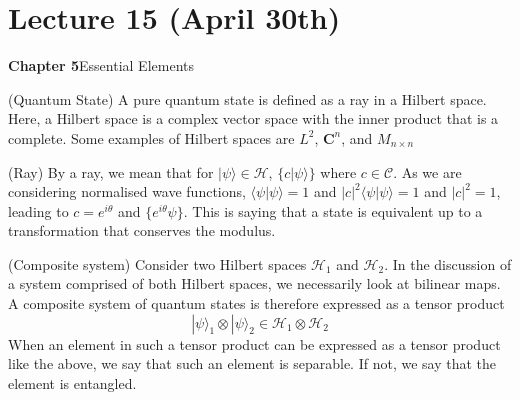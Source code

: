 \section{Lecture 15 (April 30th)}
{\bf Chapter 5}\hspace{2ex}Essential Elements
\\
\begin{defi}
(Quantum State) A pure quantum state is defined as a ray in a Hilbert space. Here, a Hilbert space is a complex vector space with the inner product that is a complete. Some examples of Hilbert spaces are $L^{2}$, ${\bm C}^{n}$, and $M_{n\times n}$ 
\end{defi}
\vspace{2ex}
\begin{defi}
(Ray) By a ray, we mean that for $|\psi \rangle \in \mathcal{H}$, $\{c|\psi \rangle \}$ where $c\in \mathcal{C}$. As we are considering normalised wave functions, $\langle \psi |\psi \rangle =1$ and $|c|^2\langle \psi |\psi \rangle =1$ and $|c|^2=1$, leading to $c=e^{i\theta }$ and $\{e^{i\theta }\psi \}$. This is saying that a state is equivalent up to a transformation that conserves the modulus.
\end{defi}
\vspace{2ex}
\begin{defi}
(Composite system) Consider two Hilbert spaces $\mathcal{H}_{1}$ and $\mathcal{H}_{2}$. In the discussion of a system comprised of both Hilbert spaces, we necessarily look at bilinear maps.  A composite system of quantum states is therefore expressed as a tensor product
\[|\psi \rangle _{1}\otimes |\psi \rangle_{2}\in \mathcal{H}_{1}\otimes \mathcal{H}_{2}\]
When an element in such a tensor product can be expressed as a tensor product like the above, we say that such an element is separable. If not, we say that the element is entangled.
\end{defi}
\vspace{2ex}
